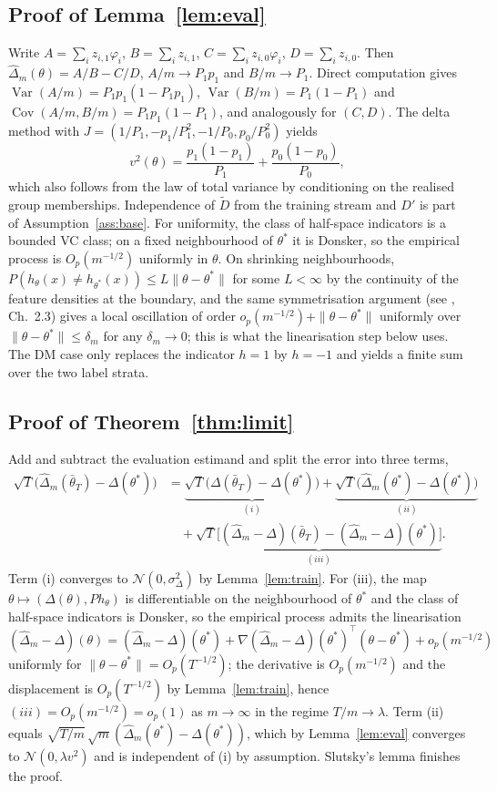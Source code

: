 \documentclass[11pt]{article}
\newcommand{\dhat}{\hat\Delta}
\newcommand{\tbar}{\bar\theta}
\newcommand{\Dp}{D'}
\newcommand{\Dt}{\tilde D}
\begin{document}
\subsection{Proof of Lemma~\ref{lem:eval}}
Write $A=\sum_{i}z_{i,1}\varphi_i$, $B=\sum_i z_{i,1}$, $C=\sum_i z_{i,0}\varphi_i$, $D=\sum_i z_{i,0}$.
Then $\dhat_m(\theta)=A/B-C/D$, $A/m\to P_1p_1$ and $B/m\to P_1$.  Direct computation gives
$\operatorname{Var}(A/m)=P_1p_1(1-P_1p_1)$, $\operatorname{Var}(B/m)=P_1(1-P_1)$ and
$\operatorname{Cov}(A/m,B/m)=P_1p_1(1-P_1)$, and analogously for $(C,D)$.  The delta method with
$J=(1/P_1,-p_1/P_1^2,-1/P_0,p_0/P_0^2)$ yields
\[
v^2(\theta)=\frac{p_1(1-p_1)}{P_1}+\frac{p_0(1-p_0)}{P_0},
\]
which also follows from the law of total variance by conditioning on the realised group memberships.
Independence of $\Dt$ from the training stream and $\Dp$ is part of Assumption~\ref{ass:base}.
For uniformity, the class of half-space indicators is a bounded VC class; on a fixed neighbourhood
of $\theta^*$ it is Donsker, so the empirical process is $O_p(m^{-1/2})$ uniformly in $\theta$.  On
shrinking neighbourhoods, $P(h_\theta(x)\neq h_{\theta^*}(x))\le L\|\theta-\theta^*\|$ for some
$L<\infty$ by the continuity of the feature densities at the boundary, and the same symmetrisation
argument (see \citealp{vdvwellner1996}, Ch.~2.3) gives a local oscillation of order
$o_p(m^{-1/2})+\|\theta-\theta^*\|$ uniformly over $\|\theta-\theta^*\|\le\delta_m$ for any
$\delta_m\to0$; this is what the linearisation step below uses.  The DM case only replaces the
indicator $h=1$ by $h=-1$ and yields a finite sum over the two label strata.

\subsection{Proof of Theorem~\ref{thm:limit}}
Add and subtract the evaluation estimand and split the error into three terms,
\begin{align*}
\sqrt T\big(\dhat_m(\tbar_T)-\Delta(\theta^*)\big)
&=\underbrace{\sqrt T\big(\Delta(\tbar_T)-\Delta(\theta^*)\big)}_{(i)}
+\underbrace{\sqrt T\big(\dhat_m(\theta^*)-\Delta(\theta^*)\big)}_{(ii)}\\
&\quad+\underbrace{\sqrt T\big[(\dhat_m-\Delta)(\tbar_T)-(\dhat_m-\Delta)(\theta^*)\big]}_{(iii)}.
\end{align*}
Term (i) converges to $\mathcal N(0,\sigma^2_\Delta)$ by Lemma~\ref{lem:train}.  For (iii), the map $\theta\mapsto(\Delta(\theta),P h_\theta)$ is differentiable on the neighbourhood of $\theta^*$ and the class of half-space indicators is Donsker, so the empirical process admits the linearisation $(\dhat_m-\Delta)(\theta)=(\dhat_m-\Delta)(\theta^*)+\nabla(\dhat_m-\Delta)(\theta^*)^\top(\theta-\theta^*)+o_p(m^{-1/2})$ uniformly for $\|\theta-\theta^*\|=O_p(T^{-1/2})$; the derivative is $O_p(m^{-1/2})$ and the displacement is $O_p(T^{-1/2})$ by Lemma~\ref{lem:train}, hence $(iii)=O_p(m^{-1/2})=o_p(1)$ as $m\to\infty$ in the regime $T/m\to\lambda$.  Term (ii) equals
$\sqrt{T/m}\,\sqrt m(\dhat_m(\theta^*)-\Delta(\theta^*))$, which by Lemma~\ref{lem:eval} converges to
$\mathcal N(0,\lambda v^2)$ and is independent of (i) by assumption.  Slutsky's lemma finishes the
proof.
\end{document}
